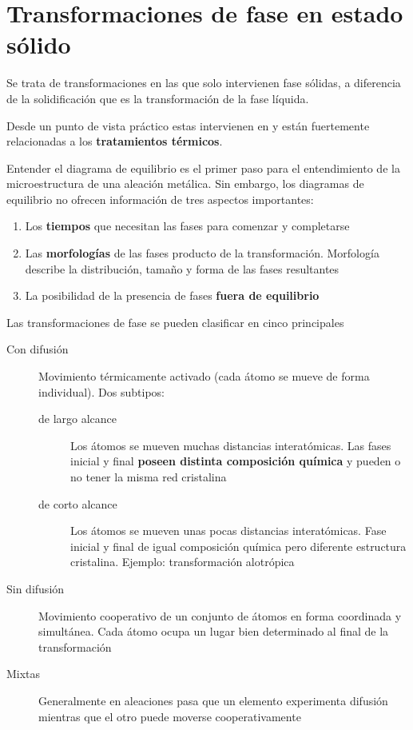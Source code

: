 \section{Transformaciones de fase en estado sólido}

Se trata de transformaciones en las que solo intervienen fase sólidas, a diferencia de la solidificación que es la transformación de la fase líquida.


Desde un punto de vista práctico estas intervienen en y están fuertemente relacionadas a los \textbf{tratamientos térmicos}.

Entender el diagrama de equilibrio es el primer paso para el entendimiento de la microestructura de una aleación metálica. Sin embargo, los diagramas de equilibrio no ofrecen información de tres aspectos importantes:

\begin{enumerate}
	\item Los {\bf tiempos} que necesitan las fases para comenzar y completarse
	\item Las {\bf morfologías} de las fases producto de la transformación. Morfología describe la distribución, tamaño y forma de las fases resultantes
	\item La posibilidad de la presencia de fases \textbf{fuera de equilibrio}
\end{enumerate}

Las transformaciones de fase se pueden clasificar en cinco principales

\begin{description}
	\item[Con difusión] Movimiento térmicamente activado (cada átomo se mueve de forma individual). Dos subtipos:
	\begin{description}
		\item[de largo alcance] Los átomos se mueven muchas distancias interatómicas. Las fases inicial y final \textbf{poseen distinta composición química} y pueden o no tener la misma red cristalina
		\item[de corto alcance]  Los átomos se mueven unas pocas distancias interatómicas. Fase inicial y final de igual composición química pero diferente estructura cristalina. Ejemplo: transformación alotrópica
	\end{description} 
	\item[Sin difusión] Movimiento cooperativo de un conjunto de átomos en forma coordinada y simultánea. Cada átomo ocupa un lugar bien determinado al final de la transformación
	\item[Mixtas] Generalmente en aleaciones pasa que un elemento experimenta difusión mientras que el otro puede moverse cooperativamente
\end{description}


